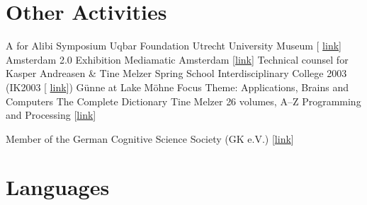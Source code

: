 \documentclass[11pt,a4paper]{moderncv}
\begin{document}
\section{Other Activities}
        {A for Alibi Symposium}
        {}
        {Uqbar Foundation}
        {Utrecht University Museum [%
        \href{http://www.sternbergpress.com/?pageId=1204}{link}]}
        {}	
        {Amsterdam 2.0 Exhibition}
        {}
        {Mediamatic}
        {Amsterdam [\href{http://www.mediamatic.net/artefact-9850-en.html}%
        {link}]}
        {Technical counsel for Kasper Andreasen \& Tine Melzer}
        {Spring School}
        {}
        {Interdisciplinary College 2003 (IK2003 [%
        \href{http://www.ik-guenne.de/html/ik2003.html}{link}])}
        {G\"{u}nne at Lake M\"{o}hne}
        {Focus Theme: Applications, Brains and Computers}
        {The Complete Dictionary}
        {}
        {Tine Melzer}
        {26 volumes, A--Z}
        {Programming and Processing
        [\href{http://www.tinemelzer.eu/works/the-complete-dictionary/}
        {link}]}

        {Member of the German Cognitive Science Society (GK e.V.)}
        {}
        {}
        {[\href{http://www.gk-ev.de}{link}]}
        {}
\closesection{}


\section{Languages}
\closesection{}


\end{document}
